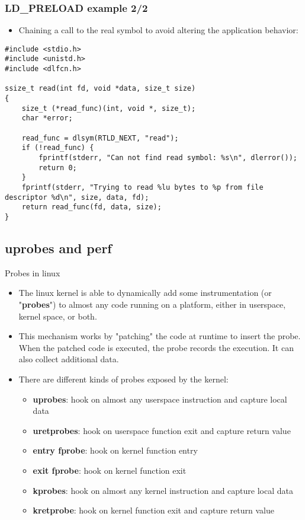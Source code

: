 \begin{frame}[fragile]
  \frametitle{LD\_PRELOAD example 2/2}
  \begin{itemize}
    \item Chaining a call to the real symbol to avoid altering the
	    application behavior:
  \end{itemize}
  \begin{block}{}
    \begin{verbatim}
#include <stdio.h>
#include <unistd.h>
#include <dlfcn.h>

ssize_t read(int fd, void *data, size_t size)
{
    size_t (*read_func)(int, void *, size_t);
    char *error;

    read_func = dlsym(RTLD_NEXT, "read");
    if (!read_func) {
        fprintf(stderr, "Can not find read symbol: %s\n", dlerror());
        return 0;
    }
    fprintf(stderr, "Trying to read %lu bytes to %p from file descriptor %d\n", size, data, fd);
    return read_func(fd, data, size);
}
    \end{verbatim}
  \end{block}
\end{frame}

\subsection{uprobes and perf}

\begin{frame}{Probes in linux}
	\begin{itemize}
    \item The linux kernel is able to dynamically add some instrumentation
      (or "\textbf{probes}") to almost any code running on a platform,
      either in userspace, kernel space, or both.
    \item This mechanism works by "patching" the code at runtime to insert
      the probe. When the patched code is executed, the probe records the
      execution. It can also collect additional data.
    \item There are different kinds of probes exposed by the kernel:
			\begin{itemize}
        \item \textbf{uprobes}: hook on almost any userspace instruction
          and capture local data
        \item \textbf{uretprobes}: hook on userspace function exit and
          capture return value
        \item \textbf{entry fprobe}: hook on kernel function entry
        \item \textbf{exit fprobe}: hook on kernel function exit
        \item \textbf{kprobes}: hook on almost any kernel instruction and
          capture local data
        \item \textbf{kretprobe}: hook on kernel function exit and capture
          return value
			\end{itemize}
	\end{itemize}
\end{frame}

